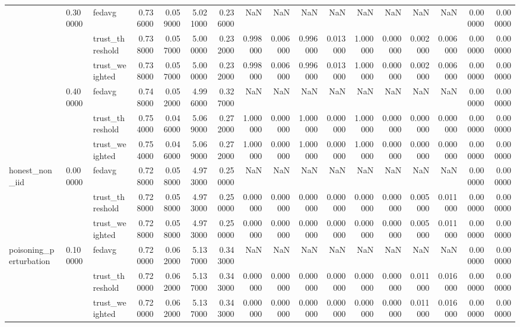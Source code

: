 \begin{tabular}{lllrrrrrrrrrrrrrr}
\cline{2-17}
 & \multirow[t]{3}{*}{0.300000} & fedavg & 0.736000 & 0.059000 & 5.021000 & 0.236000 & NaN & NaN & NaN & NaN & NaN & NaN & NaN & NaN & 0.000000 & 0.000000 \\
 &  & trust_threshold & 0.738000 & 0.057000 & 5.000000 & 0.232000 & 0.998000 & 0.006000 & 0.996000 & 0.013000 & 1.000000 & 0.000000 & 0.002000 & 0.006000 & 0.000000 & 0.000000 \\
 &  & trust_weighted & 0.738000 & 0.057000 & 5.000000 & 0.232000 & 0.998000 & 0.006000 & 0.996000 & 0.013000 & 1.000000 & 0.000000 & 0.002000 & 0.006000 & 0.000000 & 0.000000 \\
\cline{2-17}
 & \multirow[t]{3}{*}{0.400000} & fedavg & 0.748000 & 0.052000 & 4.996000 & 0.327000 & NaN & NaN & NaN & NaN & NaN & NaN & NaN & NaN & 0.000000 & 0.000000 \\
 &  & trust_threshold & 0.754000 & 0.046000 & 5.069000 & 0.272000 & 1.000000 & 0.000000 & 1.000000 & 0.000000 & 1.000000 & 0.000000 & 0.000000 & 0.000000 & 0.000000 & 0.000000 \\
 &  & trust_weighted & 0.754000 & 0.046000 & 5.069000 & 0.272000 & 1.000000 & 0.000000 & 1.000000 & 0.000000 & 1.000000 & 0.000000 & 0.000000 & 0.000000 & 0.000000 & 0.000000 \\
\cline{1-17} \cline{2-17}
\multirow[t]{3}{*}{honest_non_iid} & \multirow[t]{3}{*}{0.000000} & fedavg & 0.728000 & 0.058000 & 4.973000 & 0.250000 & NaN & NaN & NaN & NaN & NaN & NaN & NaN & NaN & 0.000000 & 0.000000 \\
 &  & trust_threshold & 0.728000 & 0.058000 & 4.973000 & 0.250000 & 0.000000 & 0.000000 & 0.000000 & 0.000000 & 0.000000 & 0.000000 & 0.005000 & 0.011000 & 0.000000 & 0.000000 \\
 &  & trust_weighted & 0.728000 & 0.058000 & 4.973000 & 0.250000 & 0.000000 & 0.000000 & 0.000000 & 0.000000 & 0.000000 & 0.000000 & 0.005000 & 0.011000 & 0.000000 & 0.000000 \\
\cline{1-17} \cline{2-17}
\multirow[t]{12}{*}{poisoning_perturbation} & \multirow[t]{3}{*}{0.100000} & fedavg & 0.720000 & 0.062000 & 5.137000 & 0.343000 & NaN & NaN & NaN & NaN & NaN & NaN & NaN & NaN & 0.000000 & 0.000000 \\
 &  & trust_threshold & 0.720000 & 0.062000 & 5.137000 & 0.343000 & 0.000000 & 0.000000 & 0.000000 & 0.000000 & 0.000000 & 0.000000 & 0.011000 & 0.016000 & 0.000000 & 0.000000 \\
 &  & trust_weighted & 0.720000 & 0.062000 & 5.137000 & 0.343000 & 0.000000 & 0.000000 & 0.000000 & 0.000000 & 0.000000 & 0.000000 & 0.011000 & 0.016000 & 0.000000 & 0.000000 \\

\end{tabular}
